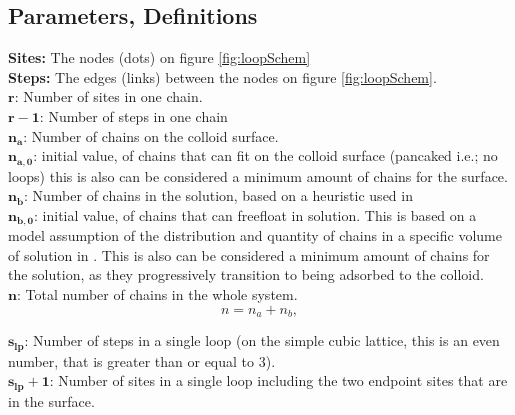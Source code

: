 \documentclass[12pt,letterpaper]{article}
\begin{document}
\subsection{Parameters, Definitions}
\textbf{Sites:} The nodes (dots) on figure \ref{fig:loopSchem}\\

\textbf{Steps:} The edges (links) between the nodes on figure 
\ref{fig:loopSchem}.\\

$
\boldsymbol{
    r
}
$: 
Number of sites in one chain.\\

$
\boldsymbol{
    r
    -
    1
}
$: 
Number of steps in one chain\\

$
\boldsymbol{
    n_{a}
}
$: 
Number of chains on the colloid surface.\\

$
\boldsymbol{
    n_{a,0}
}
$: 
initial value, of chains that can fit on the colloid surface (pancaked i.e.; no loops) this is also can be considered a minimum amount of chains for the surface.\\

$
\boldsymbol{
    n_{b}
}
$: 
Number of chains in the solution, based on a heuristic used in \cite{koumarianos2021theory}\\

$
\boldsymbol{
    n_{b,0}
}
$: 
initial value, of chains that can freefloat in solution. This is based on a model assumption of the distribution and quantity of chains in a specific volume of solution in \cite{koumarianos2021theory}. This is also can be considered a minimum amount of chains for the solution, as they progressively transition to being adsorbed to the colloid.\\


$
\boldsymbol{
    n
}
$: 
Total number of chains in the whole system.
\begin{equation}
n=n_a+n_b,
	\label{eq. n}
\end{equation}

$
\boldsymbol{
    s_{lp}
}
$: 
Number of steps in a single loop (on the simple cubic lattice, this is an even number, that is greater than or equal to 3).\\

$
\boldsymbol{
    s_{lp}
    +
    1
}
$:  
Number of sites in a single loop including the two endpoint sites that are in the surface.\\
\end{document}
